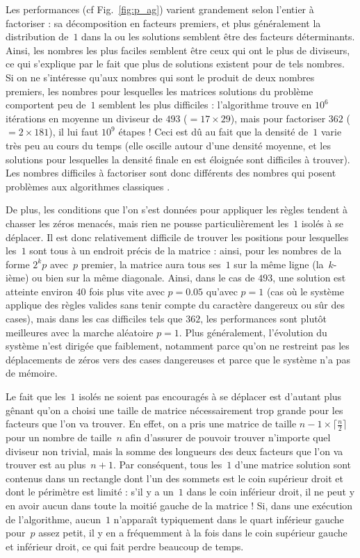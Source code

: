 Les performances  (cf Fig.~\ref{fig:p_ag})  varient grandement selon  l'entier à
factoriser :  sa dé\-composition en  facteurs premiers, et plus  généralement la
distribution  de~$1$  dans  la  ou  les solutions  semblent  être  des  facteurs
déterminants. Ainsi, les nombres les plus  faciles semblent être ceux qui ont le
plus de diviseurs, ce qui s'explique  par le fait que plus de solutions existent
pour de tels nombres. Si on ne s'intéresse qu'aux nombres qui sont le produit de
deux nombres  premiers, les  nombres pour lesquelles  les matrices  solutions du
problème  comportent peu  de~$1$  semblent les  plus  difficiles :  l'algorithme
trouve en $10^6$ itérations en moyenne  un diviseur de $493$ ($ = 17\times 29$),
mais pour factoriser $362$ ($ = 2\times  181$), il lui faut $10^9$ étapes ! Ceci
est dû  au fait que  la densité de~$1$  varie très peu  au cours du  temps (elle
oscille  autour d'une  densité  moyenne,  et les  solutions  pour lesquelles  la
densité  finale  en  est  éloignée  sont  difficiles  à  trouver).  Les  nombres
difficiles à  factoriser sont donc  différents des nombres qui  posent problèmes
aux algorithmes classiques \cite{Pom96}.

De plus, les conditions que l'on s'est données pour appliquer les règles
\linebreak tendent à chasser les zéros menacés, mais rien ne pousse
particulièrement les~$1$ isolés à se déplacer. Il est donc relativement
difficile de trouver les positions pour lesquelles les~$1$ sont tous à un
endroit précis de la matrice : ainsi, pour les nombres de la forme $2^kp$
avec~$p$ premier, la matrice aura tous ses~$1$ sur la même ligne (la~$k$-ième)
ou bien sur la même diagonale. Ainsi, dans le cas de $493$,
une solution est atteinte environ $40$ fois plus vite avec $p=0.05$ qu'avec
$p=1$ (cas où le système applique des règles valides sans tenir compte du
caractère dangereux ou sûr des cases), mais dans les cas difficiles tels que
$362$, les performances sont plutôt meilleures avec la marche aléatoire
$p=1$. Plus généralement, l'évolution du système n'est dirigée que faiblement,
notamment parce qu'on ne restreint pas les déplacements de zéros vers des cases dangereuses et parce que le système n'a pas de mémoire.

Le fait que les~$1$ isolés ne soient pas encouragés à se déplacer est d'autant plus gênant qu'on a choisi une taille de matrice nécessairement trop grande pour les facteurs que l'on va trouver. En effet, on a pris une matrice de taille $n-1 \times \lceil \frac{n}{2} \rceil$ pour un nombre de taille~$n$ afin d'assurer de pouvoir trouver n'importe quel diviseur non trivial, mais la somme des longueurs des deux facteurs que l'on va trouver est au plus~$n+1$. Par conséquent, tous les~$1$ d'une matrice solution sont contenus dans un rectangle dont l'un des sommets est le coin supérieur droit et dont le périmètre est limité : s'il y a un~$1$ dans le coin inférieur droit, il ne peut y en avoir aucun dans toute la moitié gauche de la matrice ! Si, dans une exécution de l'algorithme, aucun~$1$ n'apparaît typiquement dans le quart inférieur gauche pour~$p$ assez petit, il y en a fréquemment à la fois dans le coin supérieur gauche et inférieur droit, ce qui fait perdre beaucoup de temps. 

